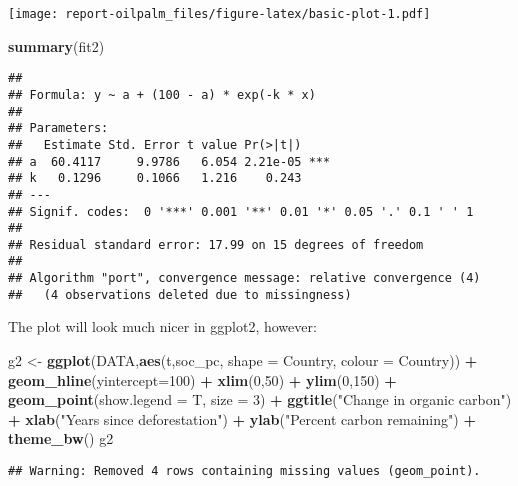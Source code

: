 \documentclass[
]{article}
\newenvironment{Shaded}{\begin{snugshade}}{\end{snugshade}}
\newcommand{\DataTypeTok}[1]{\textcolor[rgb]{0.13,0.29,0.53}{#1}}
\newcommand{\DecValTok}[1]{\textcolor[rgb]{0.00,0.00,0.81}{#1}}
\newcommand{\KeywordTok}[1]{\textcolor[rgb]{0.13,0.29,0.53}{\textbf{#1}}}
\newcommand{\NormalTok}[1]{#1}
\newcommand{\OperatorTok}[1]{\textcolor[rgb]{0.81,0.36,0.00}{\textbf{#1}}}
\newcommand{\StringTok}[1]{\textcolor[rgb]{0.31,0.60,0.02}{#1}}
\begin{document}
\texttt{[image: report-oilpalm\_files/figure-latex/basic-plot-1.pdf]}

\begin{Shaded}
\begin{Highlighting}[]
\KeywordTok{summary}\NormalTok{(fit2)}
\end{Highlighting}
\end{Shaded}

\begin{verbatim}
## 
## Formula: y ~ a + (100 - a) * exp(-k * x)
## 
## Parameters:
##   Estimate Std. Error t value Pr(>|t|)    
## a  60.4117     9.9786   6.054 2.21e-05 ***
## k   0.1296     0.1066   1.216    0.243    
## ---
## Signif. codes:  0 '***' 0.001 '**' 0.01 '*' 0.05 '.' 0.1 ' ' 1
## 
## Residual standard error: 17.99 on 15 degrees of freedom
## 
## Algorithm "port", convergence message: relative convergence (4)
##   (4 observations deleted due to missingness)
\end{verbatim}

The plot will look much nicer in ggplot2, however:

\begin{Shaded}
\begin{Highlighting}[]
\NormalTok{g2 <-}\StringTok{ }\KeywordTok{ggplot}\NormalTok{(DATA,}\KeywordTok{aes}\NormalTok{(t,soc_pc, }\DataTypeTok{shape =}\NormalTok{ Country, }\DataTypeTok{colour =}\NormalTok{ Country)) }\OperatorTok{+}
\StringTok{    }\KeywordTok{geom_hline}\NormalTok{(}\DataTypeTok{yintercept=}\DecValTok{100}\NormalTok{) }\OperatorTok{+}
\StringTok{  }\KeywordTok{xlim}\NormalTok{(}\DecValTok{0}\NormalTok{,}\DecValTok{50}\NormalTok{) }\OperatorTok{+}
\StringTok{  }\KeywordTok{ylim}\NormalTok{(}\DecValTok{0}\NormalTok{,}\DecValTok{150}\NormalTok{) }\OperatorTok{+}
\StringTok{  }\KeywordTok{geom_point}\NormalTok{(}\DataTypeTok{show.legend =}\NormalTok{ T, }\DataTypeTok{size =} \DecValTok{3}\NormalTok{) }\OperatorTok{+}
\StringTok{  }\KeywordTok{ggtitle}\NormalTok{(}\StringTok{"Change in organic carbon"}\NormalTok{) }\OperatorTok{+}
\StringTok{  }\KeywordTok{xlab}\NormalTok{(}\StringTok{"Years since deforestation"}\NormalTok{) }\OperatorTok{+}
\StringTok{  }\KeywordTok{ylab}\NormalTok{(}\StringTok{"Percent carbon remaining"}\NormalTok{) }\OperatorTok{+}
\StringTok{  }\KeywordTok{theme_bw}\NormalTok{()}
\NormalTok{g2}
\end{Highlighting}
\end{Shaded}

\begin{verbatim}
## Warning: Removed 4 rows containing missing values (geom_point).
\end{verbatim}
\end{document}
